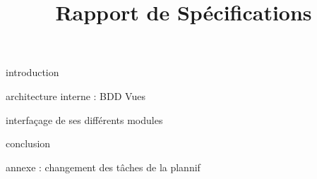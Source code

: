 \documentclass{rapport}
\title{Rapport de Spécifications}
\begin{document}
    
    \tableofcontents
  
  	introduction	
  	
  	architecture interne : 
		BDD
		Vues
	
	interfaçage de ses différents modules
	
	conclusion
  	
  	annexe : changement des tâches de la plannif
\end{document}
